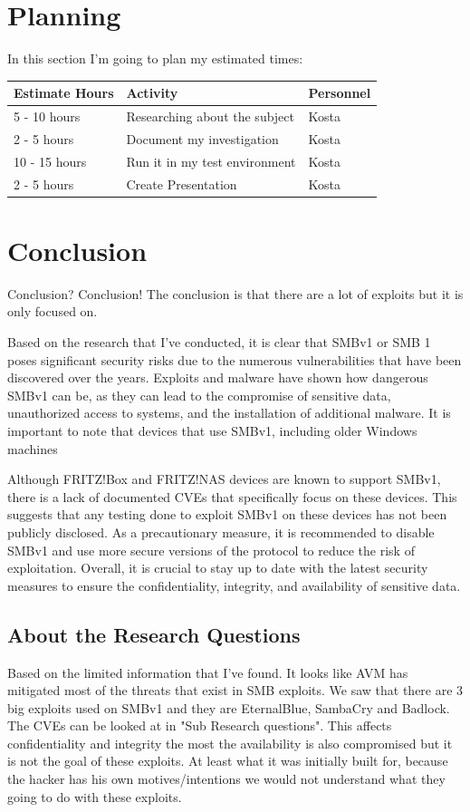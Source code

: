 \documentclass[12pt, letterpaper]{article}
\begin{document}
\newpage
\section{Planning}
In this section I'm going to plan my estimated times:
\hfill\break
    \begin{table}[htbp]
        \begin{tabular}{|l|l|l|}
            \hline
            Estimate Hours & Activity    & Personnel    \tabularnewline \hline
            5 - 10 hours   & Researching about the subject & Kosta \tabularnewline \hline
            2 - 5 hours  & Document my investigation & Kosta \tabularnewline 
            \hline
            10 - 15 hours & Run it in my test environment & Kosta \tabularnewline \hline
            2 - 5 hours & Create Presentation & Kosta \tabularnewline \hline
        \end{tabular}
    \end{table}

\section{Conclusion}
Conclusion? Conclusion! The conclusion is that there are a lot of exploits but it is only focused on.

\hfill\break
Based on the research that I've conducted, it is clear that SMBv1 or SMB 1 poses significant security risks due to the numerous vulnerabilities that have been discovered over the years. Exploits and malware have shown how dangerous SMBv1 can be, as they can lead to the compromise of sensitive data, unauthorized access to systems, and the installation of additional malware. It is important to note that devices that use SMBv1, including older Windows machines

\hfill\break
Although FRITZ!Box and FRITZ!NAS devices are known to support SMBv1, there is a lack of documented CVEs that specifically focus on these devices. This suggests that any testing done to exploit SMBv1 on these devices has not been publicly disclosed. As a precautionary measure, it is recommended to disable SMBv1 and use more secure versions of the protocol to reduce the risk of exploitation. Overall, it is crucial to stay up to date with the latest security measures to ensure the confidentiality, integrity, and availability of sensitive data.

\newpage
\subsection{About the Research Questions}
Based on the limited information that I've found. It looks like AVM has mitigated most of the threats that exist in SMB exploits. We saw that there are 3 big exploits used on SMBv1 and they are EternalBlue, SambaCry and Badlock. The CVEs can be looked at in "Sub Research questions". This affects confidentiality and integrity the most the availability is also compromised but it is not the goal of these exploits. At least what it was initially built for, because the hacker has his own motives/intentions we would not understand what they going to do with these exploits. 
\end{document}

